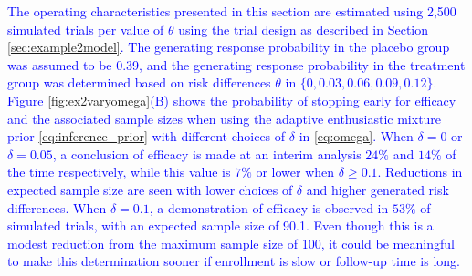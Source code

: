 \documentclass[AMA,STIX1COL,doublespace]{WileyNJD-v2}
\begin{document}
\textcolor{blue}{
The operating characteristics presented in this section are estimated using 2,500 simulated trials per value of $\theta$ using the trial design as described in Section \ref{sec:example2model}. The generating response probability in the placebo group was assumed to be 0.39, and the generating response probability in the treatment group was determined based on risk differences $\theta$ in $\{0, 0.03, 0.06, 0.09, 0.12\}$. Figure \ref{fig:ex2varyomega}(B) shows the probability of stopping early for efficacy and the associated sample sizes when using the adaptive enthusiastic mixture prior \eqref{eq:inference_prior} with different choices of $\delta$ in \eqref{eq:omega}. When $\delta=0$ or $\delta=0.05$, a conclusion of efficacy is made at an interim analysis $24\%$ and $14\%$ of the time respectively, while this value is $7\%$ or lower when $\delta \geq 0.1$. Reductions in expected sample size are seen with lower choices of $\delta$ and higher generated risk differences. When $\delta=0.1$, a demonstration of efficacy is observed in $53\%$ of simulated trials, with an expected sample size of 90.1. Even though this is a modest reduction from the maximum sample size of 100, it could be meaningful to make this determination sooner if enrollment is slow or follow-up time is long.
}
\end{document}
